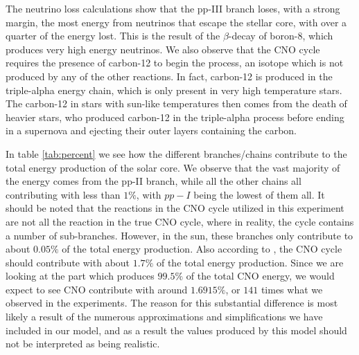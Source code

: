 \documentclass[a4paper,10pt,english]{article}
\begin{document}
The neutrino loss calculations show that the pp-III branch loses, with a strong margin, the most energy from neutrinos that escape the stellar core, with over a quarter of the energy lost. This is the result of the $\beta$-decay of boron-8, which produces very high energy neutrinos. We also observe that the CNO cycle requires the presence of carbon-12 to begin the process, an isotope which is not produced by any of the other reactions. In fact, carbon-12 is produced in the triple-alpha energy chain, which is only present in very high temperature stars. The carbon-12 in stars with sun-like temperatures then comes from the death of heavier stars, who produced carbon-12 in the triple-alpha process before ending in a supernova and ejecting their outer layers containing the carbon.

In table \ref{tab:percent} we see how the different branches/chains contribute to the total energy production of the solar core. We observe that the vast majority of the energy comes from the pp-II branch, while all the other chains all contributing with less than $1\%$, with $pp-I$ being the lowest of them all. It should be noted that the reactions in the CNO cycle utilized in this experiment are not all the reaction in the true CNO cycle, where in reality, the cycle contains a number of sub-branches. However, in the sun, these branches only contribute to about $0.05\%$ \cite{Gudiksen2015} of the total energy production. Also according to \cite{Gudiksen2015}, the CNO cycle should contribute with about $1.7\%$ of the total energy production. Since we are looking at the part which produces $99.5\%$ of the total CNO energy, we would expect to see CNO contribute with around $1.6915\%$, or $141$ times what we observed in the experiments. The reason for this substantial difference is most likely a result of the numerous approximations and simplifications we have included in our model, and as a result the values produced by this model should not be interpreted as being realistic. 
\end{document}
